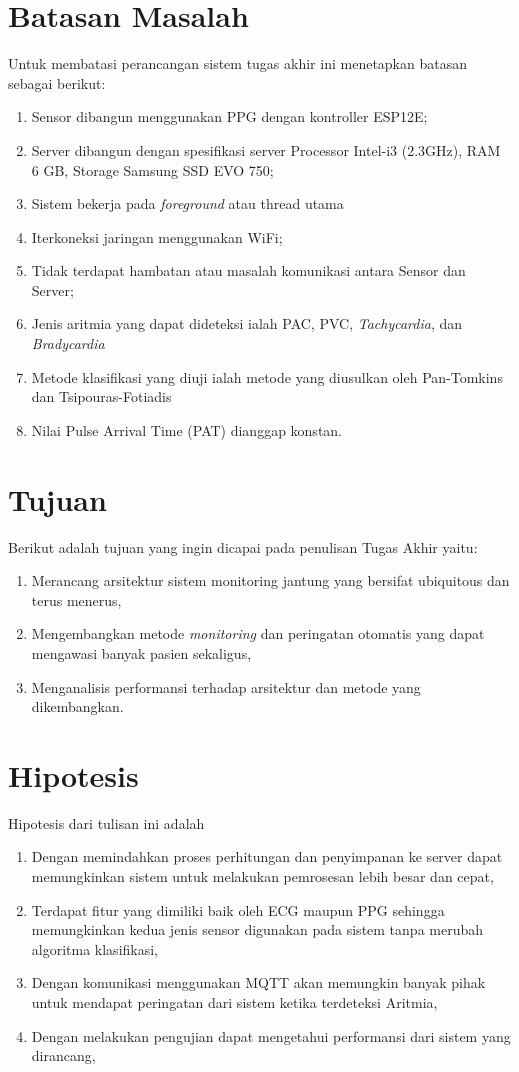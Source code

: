 \section{Batasan Masalah}
Untuk membatasi perancangan sistem tugas akhir ini menetapkan batasan sebagai berikut:
\begin{enumerate}
	\item Sensor dibangun menggunakan PPG dengan kontroller ESP12E;
    \item Server dibangun dengan spesifikasi server Processor Intel-i3 (2.3GHz), RAM 6 GB, Storage Samsung SSD EVO 750;
	\item Sistem bekerja pada \textit{foreground} atau thread utama
    \item Iterkoneksi jaringan menggunakan WiFi;
    \item Tidak terdapat hambatan atau masalah komunikasi antara Sensor dan Server;
    \item Jenis aritmia yang dapat dideteksi ialah PAC, PVC, \textit{Tachycardia}, dan \textit{Bradycardia}
    \item Metode klasifikasi yang diuji ialah metode yang diusulkan oleh Pan-Tomkins dan Tsipouras-Fotiadis
    \item Nilai Pulse Arrival Time (PAT) dianggap konstan.
\end{enumerate}
\section{Tujuan}\label{bab1:tujuan}
Berikut adalah tujuan yang ingin dicapai pada penulisan Tugas Akhir yaitu:
\begin{enumerate}
    \item Merancang arsitektur sistem monitoring jantung yang bersifat ubiquitous dan terus menerus,
    \item Mengembangkan metode \textit{monitoring} dan peringatan otomatis yang dapat mengawasi banyak pasien sekaligus,
    \item Menganalisis performansi terhadap arsitektur dan metode yang dikembangkan.
\end{enumerate}

\section{Hipotesis}
Hipotesis dari tulisan ini adalah
\begin{enumerate}
    \item Dengan memindahkan proses perhitungan dan penyimpanan ke server dapat memungkinkan sistem untuk melakukan pemrosesan lebih besar dan cepat,
    \item Terdapat fitur yang dimiliki baik oleh ECG maupun PPG sehingga memungkinkan kedua jenis sensor digunakan pada sistem tanpa merubah algoritma klasifikasi,
    \item Dengan komunikasi menggunakan MQTT akan memungkin banyak pihak untuk mendapat peringatan dari sistem ketika terdeteksi Aritmia,
	\item Dengan melakukan pengujian dapat mengetahui performansi dari sistem yang dirancang,
\end{enumerate}

